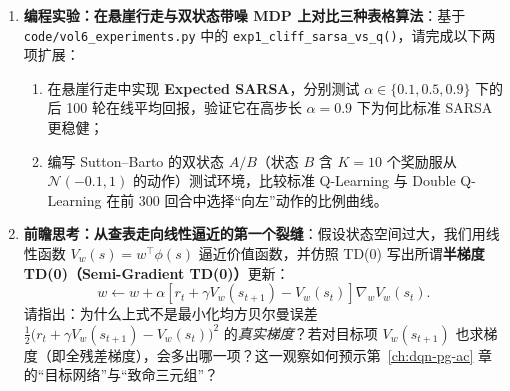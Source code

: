 \begin{enumerate}
  \item[\textbf{6.1.7}] \textbf{编程实验：在悬崖行走与双状态带噪 MDP 上对比三种表格算法}：基于 \texttt{code/vol6\_experiments.py} 中的 \texttt{exp1\_cliff\_sarsa\_vs\_q()}，请完成以下两项扩展：
  \begin{enumerate}
    \item 在悬崖行走中实现 \textbf{Expected SARSA}，分别测试 $\alpha \in \{0.1, 0.5, 0.9\}$ 下的后 100 轮在线平均回报，验证它在高步长 $\alpha=0.9$ 下为何比标准 SARSA 更稳健；
    \item 编写 Sutton--Barto 的双状态 $A/B$（状态 $B$ 含 $K=10$ 个奖励服从 $\mathcal{N}(-0.1, 1)$ 的动作）测试环境，比较标准 Q-Learning 与 Double Q-Learning 在前 300 回合中选择“向左”动作的比例曲线。
  \end{enumerate}

\par\pagebreak[4]
  \item[\textbf{6.1.8}] \textbf{前瞻思考：从查表走向线性逼近的第一个裂缝}：假设状态空间过大，我们用线性函数 $V_w(s) = w^\top \phi(s)$ 逼近价值函数，并仿照 TD(0) 写出所谓\textbf{半梯度 TD(0)（Semi-Gradient TD(0)）}更新：
  \[
    w \leftarrow w + \alpha \!\left[r_t + \gamma V_w(s_{t+1}) - V_w(s_t)\right] \nabla_w V_w(s_t).
  \]
  请指出：为什么上式不是最小化均方贝尔曼误差 $\frac{1}{2}\big(r_t + \gamma V_w(s_{t+1}) - V_w(s_t)\big)^2$ 的\emph{真实梯度}？若对目标项 $V_w(s_{t+1})$ 也求梯度（即全残差梯度），会多出哪一项？这一观察如何预示第~\ref{ch:dqn-pg-ac} 章的“目标网络”与“致命三元组”？
\end{enumerate}
